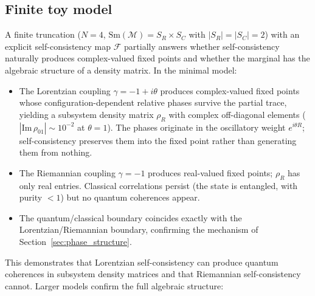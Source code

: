 \documentclass[12pt,a4paper]{article}
\theoremstyle{definition}
\theoremstyle{remark}
\begin{document}
\subsection{Finite toy model}
\label{sec:toy_model}

A finite truncation ($N = 4$, $\mathrm{Sm}(\mathcal{M}) = S_R \times
S_C$ with $|S_R| = |S_C| = 2$) with an explicit self-consistency map
$\mathcal{F}$ partially answers whether self-consistency naturally
produces complex-valued fixed points and whether the marginal has the
algebraic structure of a density matrix. In the minimal model:
\begin{itemize}
\item The Lorentzian coupling $\gamma = -1 + i\theta$ produces
complex-valued fixed points whose configuration-dependent relative
phases survive the partial trace, yielding a subsystem density matrix
$\rho_R$ with complex off-diagonal elements ($|\mathrm{Im}\,
\rho_{01}| \sim 10^{-2}$ at $\theta = 1$). The phases originate
in the oscillatory weight $e^{i\theta R}$; self-consistency preserves
them into the fixed point rather than generating them from nothing.
\item The Riemannian coupling $\gamma = -1$ produces real-valued fixed
points; $\rho_R$ has only real entries. Classical correlations persist
(the state is entangled, with purity $< 1$) but no quantum coherences
appear.
\item The quantum/classical boundary coincides exactly with the
Lorentzian/Riemannian boundary, confirming the mechanism of
Section~\ref{sec:phase_structure}.
\end{itemize}
This demonstrates that Lorentzian self-consistency can produce quantum
coherences in subsystem density matrices and that Riemannian
self-consistency cannot. Larger models confirm the full algebraic
structure:
\end{document}
